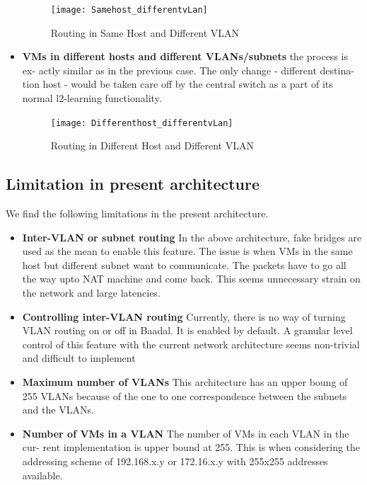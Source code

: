 \begin{itemize}
\begin{figure}[h]
\caption{Routing in Same Host and Different VLAN}
\centering
\texttt{[image: Samehost\_differentvLan]}
\end{figure}

\newpage

\item \textbf{VMs in different hosts and different VLANs/subnets} the process is ex-
actly similar as in the previous case. The only change - different destina-
tion host - would be taken care off by the central switch as a part of its
normal l2-learning functionality.

\begin{figure}[h]
\caption{Routing in Different Host and Different VLAN}
\centering
\texttt{[image: Differenthost\_differentvLan]}
\end{figure}

\end{itemize}

\pagebreak 

\subsection{Limitation in present architecture}
We find the following limitations in the present architecture.

\begin{itemize}
\item \textbf{Inter-VLAN or subnet routing} In the above architecture, fake bridges are
used as the mean to enable this feature. The issue is when VMs in the
same host but different subnet want to communicate. The packets have to
go all the way upto NAT machine and come back. This seems unnecessary
strain on the network and large latencies.

\item  \textbf{Controlling inter-VLAN routing} Currently, there is no way of turning VLAN
routing on or off in Baadal. It is enabled by default. A granular level control of this feature with the current network architecture seems non-trivial
and difficult to implement



\item \textbf{Maximum number of VLANs} This architecture has an upper boung of 255
VLANs because of the one to one correspondence between the subnets
and the VLANs.


\item \textbf{Number of VMs in a VLAN} The number of VMs in each VLAN in the cur-
rent implementation is upper bound at 255. This is when considering the
addressing scheme of 192.168.x.y or 172.16.x.y with 255x255 addresses
available.

\end{itemize}


